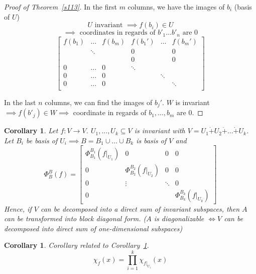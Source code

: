 \documentclass[a4paper]{article}
\newcounter{lecref}[section]
\numberwithin{lecref}{section}
\newtheorem{corollary}[lecref]{Corollary}
\begin{document}
\begin{proof}[Proof of Theorem~\ref{s113}]\hfill{}
  In the first $m$ columns, we have the images of $b_i$ (basis of $U$)
  \[ U \text{ invariant } \implies f(b_i) \in U \]
  \[ \implies \text{ coordinates in regards of } b'_1 \dots b'_n \text{ are } 0 \]
  \[
    \begin{bmatrix}
      f(b_1) & \dots  & f(b_m) & f(b_1') & \dots  & f(b_m') \\
             & \ddots &        & 0       &        & 0 \\
             &        &        & 0       &        & 0 \\
      0      & \dots  & 0      & \ddots  &        & \\
      0      & \dots  & 0      &         & \ddots & \\
      0      & \dots  & 0      &         &        & \ddots \\
    \end{bmatrix}
  \]

  In the last $n$ columns, we can find the images of $b_j'$.
  $W$ is invariant $\implies f(b'_j) \in W \implies$ coordinate in regards of $b_1, \dots, b_m$ are $0$.
\end{proof}

\begin{corollary} %
  \label{k116}
  Let $f: V \to V$. $U_1, \dots, U_k \subseteq V$ is invariant with $V = U_1 \dot+ U_2 \dot+ \dots \dot+ U_k$.
  Let $B_i$ be basis of $U_i \implies B = B_1 \cup \dots \cup B_k$ is basis of $V$ and
  \[
    \Phi_B^B(f) = \left[\begin{array}{c|ccc}
      \Phi_{B_1}^{B_1}(f|_{U_1}) & 0 & 0 & 0 \\
    \hline
      0 & \Phi_{B_2}^{B_2}(f|_{U_2}) & 0 & 0 \\
      0 & \vdots & \ddots & 0 \\
      0 &   &  & \Phi_{B_k}^{B_k}(f|_{U_k})
    \end{array}\right]
  \]
  Hence, if $V$ can be decomposed into a direct sum of invariant subspaces, then $A$ can be transformed into block diagonal form.
  ($A$ is diagonalizable $\iff V$ can be decomposed into direct sum of one-dimensional subspaces)
\end{corollary}

\begin{corollary} %
  Corollary related to Corollary~\ref{k116}.
  \[ \chi_f(x) = \prod_{i=1}^k \chi_{f|_{U_i}}(x) \]
\end{corollary}
\end{document}
